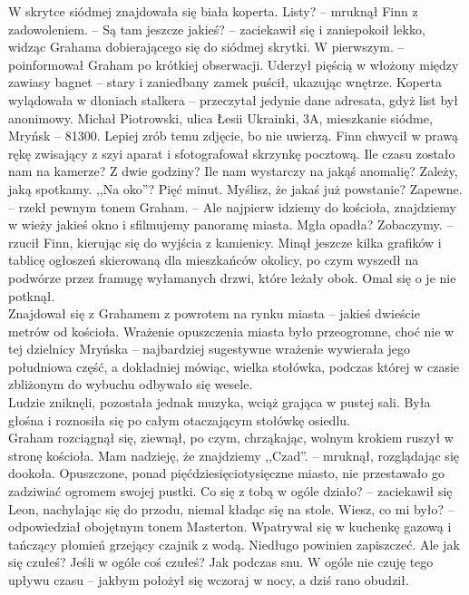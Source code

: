 \documentclass[../MAIN.tex]{subfiles}
\begin{document}
W skrytce siódmej znajdowała się biała koperta.
\sx Listy? -- mruknął Finn z zadowoleniem. -- Są tam jeszcze jakieś? -- zaciekawił się i zaniepokoił lekko, widząc Grahama dobierającego się do siódmej skrytki.
\xx W pierwszym. -- poinformował Graham po krótkiej obserwacji. Uderzył pięścią w włożony między zawiasy bagnet -- stary i zaniedbany zamek puścił, ukazując wnętrze. Koperta wylądowała w dłoniach stalkera -- przeczytał jedynie dane adresata, gdyż list był anonimowy.
\xx Michał Piotrowski, ulica Łesii Ukrainki, 3A, mieszkanie siódme, Mryńsk -- 81300. Lepiej zrób temu zdjęcie, bo nie uwierzą.
\qd
Finn chwycił w prawą rękę zwisający z szyi aparat i sfotografował skrzynkę pocztową.
\sx Ile czasu zostało nam na kamerze?
\xx Z dwie godziny?
\xx Ile nam wystarczy na jakąś anomalię?
\xx Zależy, jaką spotkamy.
\xx ,,Na oko''?
\xx Pięć minut. Myślisz, że jakaś już powstanie?
\xx Zapewne. -- rzekł pewnym tonem Graham. -- Ale najpierw idziemy do kościoła, znajdziemy w wieży jakieś okno i sfilmujemy panoramę miasta. Mgła opadła?
\xx Zobaczymy. -- rzucił Finn, kierując się do wyjścia z kamienicy. 
\qd
Minął jeszcze kilka grafików i tablicę ogłoszeń skierowaną dla mieszkańców okolicy, po czym wyszedł na podwórze przez framugę wyłamanych drzwi, które leżały obok. Omal się o je nie potknął.\\
Znajdował się z Grahamem z powrotem na rynku miasta -- jakieś dwieście metrów od kościoła. Wrażenie opuszczenia miasta było przeogromne, choć nie w tej dzielnicy Mryńska -- najbardziej sugestywne wrażenie wywierała jego południowa część, a dokładniej mówiąc, wielka stołówka, podczas której w czasie zbliżonym do wybuchu odbywało się wesele.\\
Ludzie zniknęli, pozostała jednak muzyka, wciąż grająca w pustej sali. Była głośna i roznosiła się po całym otaczającym stołówkę osiedlu.\\
Graham rozciągnął się, ziewnął, po czym, chrząkając, wolnym krokiem ruszył w stronę kościoła.
\sx Mam nadzieję, że znajdziemy ,,Czad''. -- mruknął, rozglądając się dookoła.
\qd
Opuszczone, ponad pięćdziesięciotysięczne miasto, nie przestawało go zadziwiać ogromem swojej pustki.
\dd\sx
Co się z tobą w ogóle działo? -- zaciekawił się Leon, nachylając się do przodu, niemal kładąc się na stole.
\xx Wiesz, co mi było? -- odpowiedział obojętnym tonem Masterton. Wpatrywał się w kuchenkę gazową i tańczący płomień grzejący czajnik z wodą. Niedługo powinien zapiszczeć.
\xx Ale jak się czułeś? Jeśli w ogóle coś czułeś?
\xx Jak podczas snu. W ogóle nie czuję tego upływu czasu -- jakbym położył się wczoraj w nocy, a dziś rano obudził.
\end{document}
